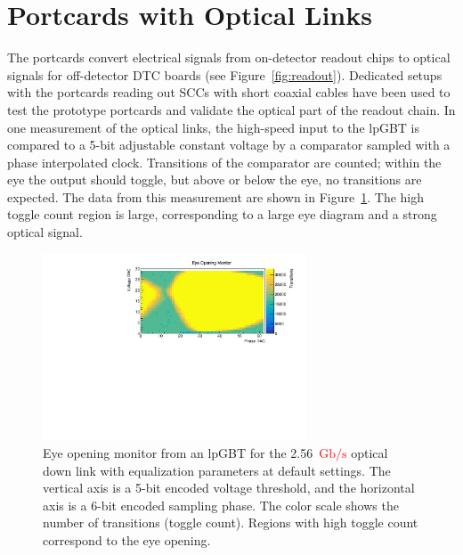 \documentclass[a4paper,11pt]{article}
\newcommand{\vtrxp}{VTRx+}
\newcommand{\fig}{Figure}
\newcommand{\gbps}{\ensuremath{\mathrm{Gb}/\mathrm{s}}\xspace}
\newcommand{\red}{\textcolor{red}}
\begin{document}
\section{Portcards with Optical Links}
\label{sec:optical}

The portcards convert electrical signals from on-detector readout chips to optical signals for off-detector DTC boards (see \fig~\ref{fig:readout}).
Dedicated setups with the portcards reading out SCCs with short coaxial cables have been used to test the prototype portcards and validate the optical part of the readout chain.
In one measurement of the optical links, the high-speed input to the lpGBT is compared to a 5-bit adjustable constant voltage by a comparator sampled with a phase interpolated clock.
Transitions of the comparator are counted; within the eye the output should toggle, but above or below the eye, no transitions are expected.
The data from this measurement are shown in \fig~\ref{fig:lpgbt_eye}.
The high toggle count region is large, corresponding to a large eye diagram and a strong optical signal.

%


\begin{figure}[htbp]
\centering
\includegraphics[width=0.70\textwidth,origin=c]{../figures/lpGBT_eye.pdf}
\caption{
\label{fig:lpgbt_eye}
Eye opening monitor from an lpGBT for the 2.56~\red{\gbps} optical down link with equalization parameters at default settings.
The vertical axis is a 5-bit encoded voltage threshold, and the horizontal axis is a 6-bit encoded sampling phase.
The color scale shows the number of transitions (toggle count).
Regions with high toggle count correspond to the eye opening.
}
\end{figure}
\end{document}
